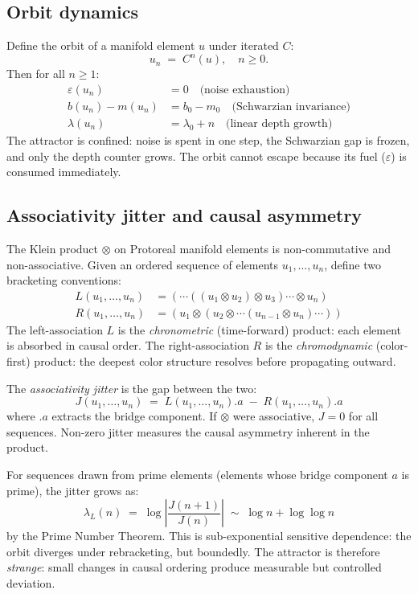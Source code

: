 \subsection{Orbit dynamics}

Define the orbit of a manifold element $u$ under iterated $C$:
\[
u_n \;=\; C^n(u), \quad n \geq 0.
\]
Then for all $n \geq 1$:
\begin{align}
\varepsilon(u_n) &= 0 \quad \text{(noise exhaustion)} \\
b(u_n) - m(u_n) &= b_0 - m_0 \quad \text{(Schwarzian invariance)} \\
\lambda(u_n) &= \lambda_0 + n \quad \text{(linear depth growth)}
\end{align}
The attractor is confined: noise is spent in one step,
the Schwarzian gap is frozen, and only the depth counter
grows. The orbit cannot escape because its fuel ($\varepsilon$)
is consumed immediately.

\subsection{Associativity jitter and causal asymmetry}

The Klein product $\otimes$ on Protoreal manifold elements is
non-commutative and non-associative. Given an ordered sequence
of elements $u_1, \ldots, u_n$, define two bracketing conventions:
\begin{align}
L(u_1, \ldots, u_n) &= (\cdots((u_1 \otimes u_2) \otimes u_3) \cdots \otimes u_n) \\
R(u_1, \ldots, u_n) &= (u_1 \otimes (u_2 \otimes \cdots (u_{n-1} \otimes u_n) \cdots))
\end{align}
The left-association $L$ is the \emph{chronometric} (time-forward)
product: each element is absorbed in causal order. The
right-association $R$ is the \emph{chromodynamic} (color-first)
product: the deepest color structure resolves before propagating
outward.

The \emph{associativity jitter} is the gap between the two:
\[
J(u_1, \ldots, u_n) \;=\; L(u_1, \ldots, u_n).a \;-\; R(u_1, \ldots, u_n).a
\]
where $.a$ extracts the bridge component. If $\otimes$ were
associative, $J = 0$ for all sequences. Non-zero jitter
measures the causal asymmetry inherent in the product.

For sequences drawn from prime elements (elements whose
bridge component $a$ is prime), the jitter grows as:
\[
\lambda_L(n) \;=\; \log\!\left|\frac{J(n+1)}{J(n)}\right|
\;\sim\; \log n + \log\log n
\]
by the Prime Number Theorem. This is sub-exponential sensitive
dependence: the orbit diverges under rebracketing, but
boundedly. The attractor is therefore \emph{strange}: small
changes in causal ordering produce measurable but controlled
deviation.

